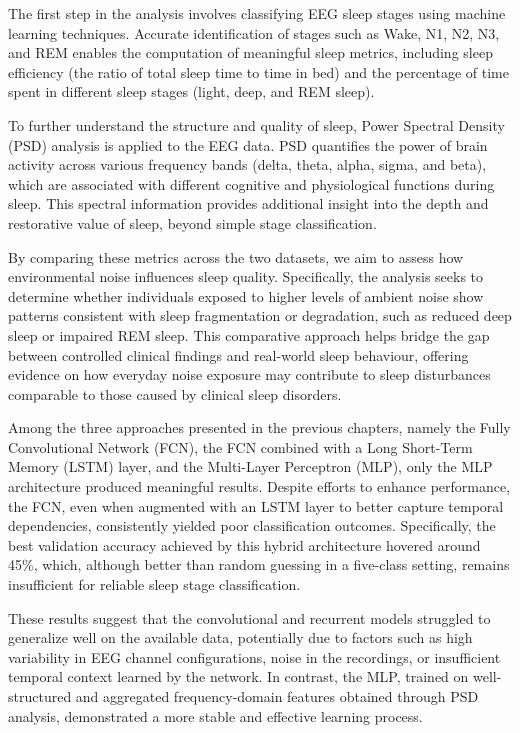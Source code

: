 The first step in the analysis involves classifying EEG sleep stages using machine learning techniques. Accurate identification of stages such as Wake, N1, N2, N3, and REM enables the computation of meaningful sleep metrics, including sleep efficiency (the ratio of total sleep time to time in bed) and the percentage of time spent in different sleep stages (light, deep, and REM sleep).

To further understand the structure and quality of sleep, Power Spectral Density (PSD) analysis is applied to the EEG data. PSD quantifies the power of brain activity across various frequency bands (delta, theta, alpha, sigma, and beta), which are associated with different cognitive and physiological functions during sleep. This spectral information provides additional insight into the depth and restorative value of sleep, beyond simple stage classification.

By comparing these metrics across the two datasets, we aim to assess how environmental noise influences sleep quality. Specifically, the analysis seeks to determine whether individuals exposed to higher levels of ambient noise show patterns consistent with sleep fragmentation or degradation, such as reduced deep sleep or impaired REM sleep. This comparative approach helps bridge the gap between controlled clinical findings and real-world sleep behaviour, offering evidence on how everyday noise exposure may contribute to sleep disturbances comparable to those caused by clinical sleep disorders. 

Among the three approaches presented in the previous chapters, namely the Fully Convolutional Network (FCN), the FCN combined with a Long Short-Term Memory (LSTM) layer, and the Multi-Layer Perceptron (MLP), only the MLP architecture produced meaningful results. Despite efforts to enhance performance, the FCN, even when augmented with an LSTM layer to better capture temporal dependencies, consistently yielded poor classification outcomes. Specifically, the best validation accuracy achieved by this hybrid architecture hovered around 45\%, which, although better than random guessing in a five-class setting, remains insufficient for reliable sleep stage classification.

These results suggest that the convolutional and recurrent models struggled to generalize well on the available data, potentially due to factors such as high variability in EEG channel configurations, noise in the recordings, or insufficient temporal context learned by the network. In contrast, the MLP, trained on well-structured and aggregated frequency-domain features obtained through PSD analysis, demonstrated a more stable and effective learning process.

